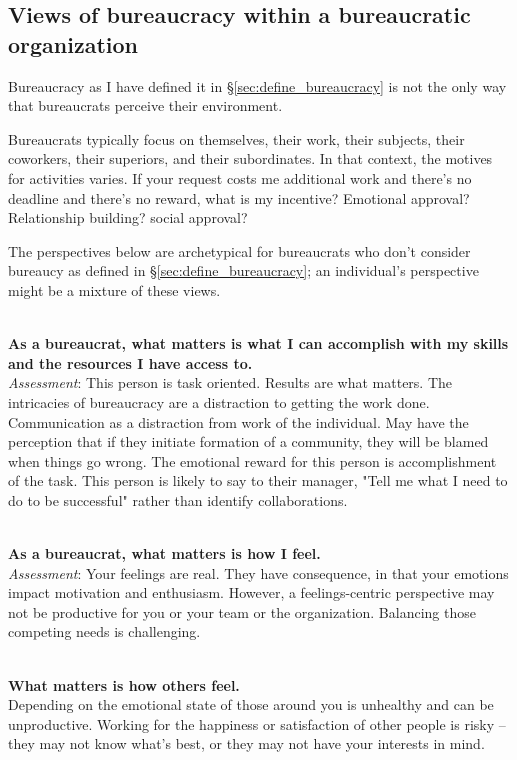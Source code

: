 \subsection{Views of bureaucracy within a bureaucratic organization\label{sec:alternative_views_from_within}}

Bureaucracy as I have defined it in \S\ref{sec:define_bureaucracy} is not the only way that bureaucrats perceive their environment. 

Bureaucrats typically focus on themselves, their work, their subjects, their coworkers, their superiors, and their subordinates. In that context, the motives for activities varies.  If your request costs me additional work and there's no deadline and there's no reward, what is my incentive? Emotional approval? Relationship building? social approval?

The perspectives below are archetypical for bureaucrats who don't consider bureaucy as defined in \S\ref{sec:define_bureaucracy}; an individual's perspective might be a mixture of these views.

\ \\

\textbf{As a bureaucrat, what matters is what I can accomplish with my skills and the resources I have access to.} \\
\textit{Assessment}: This person is task oriented. Results are what matters. The intricacies of bureaucracy are a distraction to getting the work done. 
Communication as a distraction from work of the individual. 
May have the perception that if they initiate formation of a community, they will be blamed when things go wrong.
The emotional reward for this person is accomplishment of the task. This person is likely to say to their manager, "Tell me what I need to do to be successful" rather than identify collaborations.

\ \\

\textbf{As a bureaucrat, what matters is how I feel.} \\
\textit{Assessment}: Your feelings are real. They have consequence, in that your emotions impact motivation and enthusiasm. However, a feelings-centric perspective may not be productive for you or your team or the organization. Balancing those competing needs is challenging.

\ \\ 

\textbf{What matters is how others feel.}\\
Depending on the emotional state of those around you is unhealthy and can be unproductive. Working for the happiness or satisfaction of other people is risky -- they may not know what's best, or they may not have your interests in mind.

